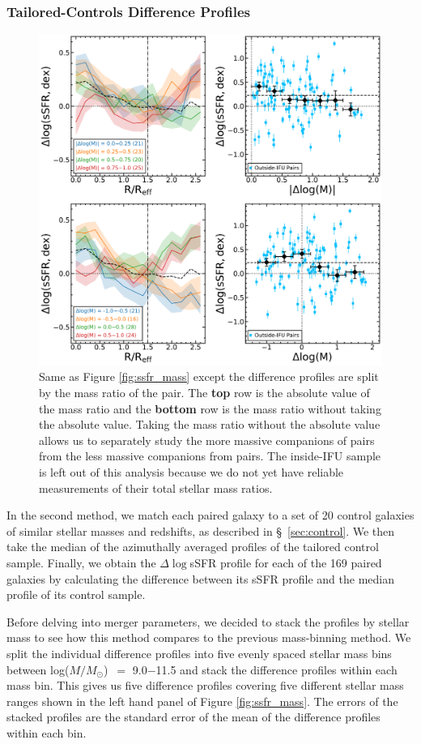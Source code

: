 \documentclass[apj,twocolumn]{emulateapj}
\newcommand{\logm}{log($M/M_{\odot}$)}
\begin{document}
\begin{CJK*}{UTF8}{gbsn}
\subsubsection{Tailored-Controls Difference Profiles}\label{sec:tailored}
\begin{figure}
\centering
\includegraphics[width=0.8\linewidth]{ssfr_dm.pdf}
\caption[]{Same as Figure \ref{fig:ssfr_mass} except the difference profiles are split by the mass ratio of the pair. The \textbf{top} row is the absolute value of the mass ratio and the \textbf{bottom} row is the mass ratio without taking the absolute value. Taking the mass ratio without the absolute value allows us to separately study the more massive companions of pairs from the less massive companions from pairs. The inside-IFU sample is left out of this analysis because we do not yet have reliable measurements of their total stellar mass ratios.}
\label{fig:ssfr_dm}
\end{figure}
In the second method, we match each paired galaxy to a set of 20 control galaxies of similar stellar masses and redshifts, as described in \S~\ref{sec:control}. We then take the median of the azimuthally averaged profiles of the tailored control sample. Finally, we obtain the $\Delta\log$sSFR profile for each of the 169 paired galaxies by calculating the difference between its sSFR profile and the median profile of its control sample.

Before delving into merger parameters, we decided to stack the profiles by stellar mass to see how this method compares to the previous mass-binning method. We split the individual difference profiles into five evenly spaced stellar mass bins between \logm\ $=$ 9.0$-$11.5 and stack the difference profiles within each mass bin. This gives us five difference profiles covering five different stellar mass ranges shown in the left hand panel of Figure \ref{fig:ssfr_mass}. The errors of the stacked profiles are the standard error of the mean of the difference profiles within each bin.


\end{CJK*}
\end{document}
